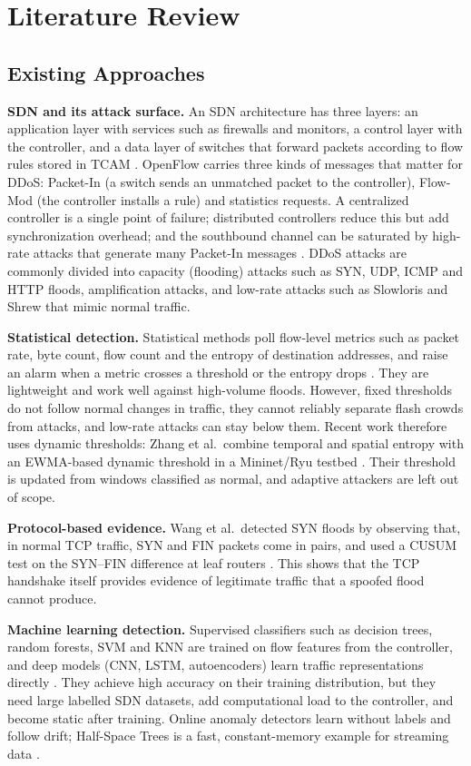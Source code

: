 \documentclass[12pt,a4paper,oneside]{report}
\begin{document}
\chapter{Literature Review}
\section{Existing Approaches}
\textbf{SDN and its attack surface.} An SDN architecture has three layers: an application layer with services such as firewalls and monitors, a control layer with the controller, and a data layer of switches that forward packets according to flow rules stored in TCAM \citep{sinha2025survey}. OpenFlow carries three kinds of messages that matter for DDoS: Packet-In (a switch sends an unmatched packet to the controller), Flow-Mod (the controller installs a rule) and statistics requests. A centralized controller is a single point of failure; distributed controllers reduce this but add synchronization overhead; and the southbound channel can be saturated by high-rate attacks that generate many Packet-In messages \citep{sinha2025survey,wang_sdn_survey}. DDoS attacks are commonly divided into capacity (flooding) attacks such as SYN, UDP, ICMP and HTTP floods, amplification attacks, and low-rate attacks such as Slowloris and Shrew that mimic normal traffic.

\textbf{Statistical detection.} Statistical methods poll flow-level metrics such as packet rate, byte count, flow count and the entropy of destination addresses, and raise an alarm when a metric crosses a threshold or the entropy drops \citep{wang_sdn_survey}. They are lightweight and work well against high-volume floods. However, fixed thresholds do not follow normal changes in traffic, they cannot reliably separate flash crowds from attacks, and low-rate attacks can stay below them. Recent work therefore uses dynamic thresholds: Zhang et al.\ combine temporal and spatial entropy with an EWMA-based dynamic threshold in a Mininet/Ryu testbed \citep{zhang2026time}. Their threshold is updated from windows classified as normal, and adaptive attackers are left out of scope.

\textbf{Protocol-based evidence.} Wang et al.\ detected SYN floods by observing that, in normal TCP traffic, SYN and FIN packets come in pairs, and used a CUSUM test on the SYN--FIN difference at leaf routers \citep{wang2002syn}. This shows that the TCP handshake itself provides evidence of legitimate traffic that a spoofed flood cannot produce.

\textbf{Machine learning detection.} Supervised classifiers such as decision trees, random forests, SVM and KNN are trained on flow features from the controller, and deep models (CNN, LSTM, autoencoders) learn traffic representations directly \citep{sinha2025survey,wang_sdn_survey}. They achieve high accuracy on their training distribution, but they need large labelled SDN datasets, add computational load to the controller, and become static after training. Online anomaly detectors learn without labels and follow drift; Half-Space Trees is a fast, constant-memory example for streaming data \citep{tan2011hst}.
\end{document}

